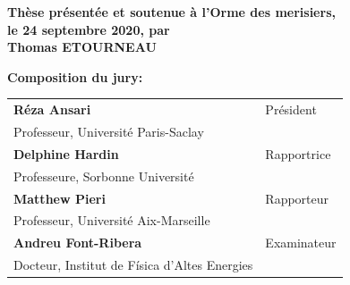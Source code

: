 \begin{titlepage}
\textbf{Thèse présentée et soutenue à l'Orme des merisiers, }\\
\textbf{le 24 septembre 2020, par} \\
\bigskip
\Large {\color{Prune} \textbf{Thomas ETOURNEAU}}


\vspace{\fill} %

\flushleft \small \textbf{Composition du jury:}
\bigskip



\scriptsize
\begin{tabular}{|p{8cm}l}
\arrayrulecolor{Prune}
\textbf{Réza Ansari} &   Président\\ 
Professeur, Université Paris-Saclay & \\
\textbf{Delphine Hardin} &  Rapportrice \\ 
Professeure, Sorbonne Université   &   \\ 
\textbf{Matthew Pieri} &  Rapporteur \\ 
Professeur, Université Aix-Marseille  &   \\ 
\textbf{Andreu Font-Ribera} &  Examinateur \\ 
Docteur, Institut de Física d’Altes Energies   &   \\ 

\end{tabular} 





\end{titlepage}
